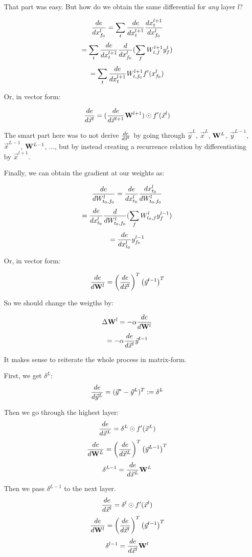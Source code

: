 That part was easy. But how do we obtain the same differential for \emph{any} layer $l$?

$$  \frac{ \mathop{de} }{ \mathop{dx_{f_0}^l} }  = \sum_t  \frac{ \mathop{de} }{ \mathop{dx_t^{l+1}} }   \frac{ \mathop{dx_t^{l+1}} }{ \mathop{dx_{f_0}^l} }   $$
$$                         = \sum_t  \frac{ \mathop{de} }{ \mathop{dx_t^{l+1}} }   \frac{ \mathop{d} }{ \mathop{dx_{f_0}^l} }  ( \sum_f W_{t,f}^{l+1} y_f^l ) $$
$$                         = \sum_t  \frac{ \mathop{de} }{ \mathop{dx_t^{l+1}} }  W_{t,f_0}^{l+1} f'(x_{f_0}^l)  $$

Or, in vector form: 

$$  \frac{ \mathop{de} }{ \mathop{d\vec{x}^l} }  = (  \frac{ \mathop{de} }{ \mathop{d\vec{x}^{l+1}} }  \mathbf{W}^{l+1} ) \odot f'(\vec{x}^l)  $$

The smart part here was to not derive $  \frac{ \mathop{de} }{ \mathop{d\vec{x}^l} }  $ by going through $\vec{y}^L$, $\vec{x}^L$, $\mathbf{W}^L$, $\vec{y}^{L-1}$, $\vec{x}^{L-1}$, $\mathbf{W}^{L-1}$, ..., but by instead creating a recurrence relation by differentiating by $\vec{x}^{l+1}$.

Finally, we can obtain the gradient at our weights as: 

$$  \frac{ \mathop{de} }{ \mathop{dW_{t_0, f_0}^l} }  =  \frac{ \mathop{de} }{ \mathop{dx_{t_0}^l} }   \frac{ \mathop{dx_{t_0}^l} }{ \mathop{dW_{t_0, f_0}^l} }    $$
$$                              =  \frac{ \mathop{de} }{ \mathop{dx_{t_0}^l} }   \frac{ \mathop{d} }{ \mathop{dW_{t_0, f_0}^l} }  ( \sum_f W_{t_0, f}^l y_f^{l-1} ) $$
$$                              =  \frac{ \mathop{de} }{ \mathop{dx_{t_0}^l} }  y_{f_0}^{l-1} $$

Or, in vector form: 

$$  \frac{ \mathop{de} }{ \mathop{d\mathbf{W}^l} }  = \left(  \frac{ \mathop{de} }{ \mathop{d\vec{x}^l} }  \right)^T  \left( \vec{y}^{l-1} \right)^T $$ 

So we should change the weigths by: 

$$ \Delta \mathbf{W}^l = - \alpha  \frac{ \mathop{de} }{ \mathop{d\mathbf{W}^l} }  $$
$$ = - \alpha  \frac{ \mathop{de} }{ \mathop{d\vec{x}^l} }  \vec{y}^{l-1} $$


It makes sense to reiterate the whole process in matrix-form. 

First, we  get $\delta^L$:
$$  \frac{ \mathop{de} }{ \mathop{d\vec{y}^L} }  = (\vec{y}^* - \vec{y}^L)^T := \delta^L $$ 

Then we go through the highest layer:
$$  \frac{ \mathop{de} }{ \mathop{d\vec{x}^L} }  = \delta^L \odot f'(\vec{x}^L)  $$
$$  \frac{ \mathop{de} }{ \mathop{d\mathbf{W}^L} }  = \left(  \frac{ \mathop{de} }{ \mathop{d\vec{x}^L} }  \right)^T \left( \vec{y}^{L-1} \right)^T $$
$$ \delta^{L-1} =  \frac{ \mathop{de} }{ \mathop{d\vec{x}^L} }  \mathbf{W}^L $$

Then we pass $\delta^{L-1}$ to the next layer. 
$$  \frac{ \mathop{de} }{ \mathop{d\vec{x}^l} }  = \delta^l \odot f'(\vec{x}^l)  $$
$$  \frac{ \mathop{de} }{ \mathop{d\mathbf{W}^l} }  = \left(  \frac{ \mathop{de} }{ \mathop{d\vec{x}^l} }  \right)^T  \left( \vec{y}^{l-1} \right)^T $$
$$ \delta^{l-1} =  \frac{ \mathop{de} }{ \mathop{d\vec{x}^l} }  \mathbf{W}^l $$




